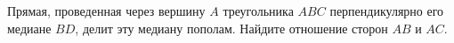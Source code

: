 Прямая,  проведенная  через  вершину  $A$  треугольника $ABC$ перпендикулярно его медиане $BD$, 
делит эту медиану пополам. Найдите отношение сторон $AB$ и $AC$.